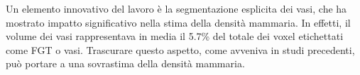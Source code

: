 Un elemento innovativo del lavoro è la segmentazione esplicita dei vasi, che ha mostrato impatto significativo nella stima della densità mammaria. In effetti, il volume dei vasi rappresentava in media il 5.7\% del totale dei voxel etichettati come FGT o vasi. Trascurare questo aspetto, come avveniva in studi precedenti, può portare a una sovrastima della densità mammaria.



